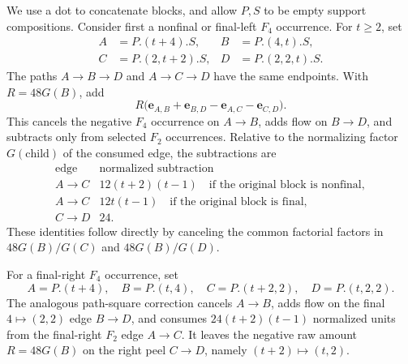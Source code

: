 \documentclass[11pt]{amsart}
\theoremstyle{definition}
\theoremstyle{remark}
\newcommand{\edge}[2]{\mathbf e_{#1,#2}}
\begin{document}
We use a dot to concatenate blocks, and allow $P,S$ to be empty support
compositions.  Consider first a nonfinal or final-left $F_4$ occurrence.
For $t\ge2$, set
\begin{equation}
 \begin{aligned}
 A&=P.(t+4).S,&B&=P.(4,t).S,\\
 C&=P.(2,t+2).S,&D&=P.(2,2,t).S.
 \end{aligned}
 \label{eq:left-square-vertices}
\end{equation}
The paths $A\to B\to D$ and $A\to C\to D$ have the same endpoints.
With $R=48G(B)$, add
\begin{equation}
 R\bigl(\edge AB+\edge BD-\edge AC-\edge CD\bigr).
 \label{eq:left-square}
\end{equation}
This cancels the negative $F_4$ occurrence on $A\to B$, adds flow on
$B\to D$, and subtracts only from selected $F_2$ occurrences.  Relative
to the normalizing factor $G(\text{child})$ of the consumed edge, the
subtractions are
\begin{equation}
 \begin{array}{c|c}
 \text{edge}&\text{normalized subtraction}\\ \hline
 A\to C&12(t+2)(t-1)\quad\text{if the original block is nonfinal},\\
 A\to C&12t(t-1)\quad\text{if the original block is final},\\
 C\to D&24.
 \end{array}
 \label{eq:left-square-costs}
\end{equation}
These identities follow directly by canceling the common factorial factors
in $48G(B)/G(C)$ and $48G(B)/G(D)$.

For a final-right $F_4$ occurrence, set
\begin{equation}
 A=P.(t+4),\quad B=P.(t,4),\quad
 C=P.(t+2,2),\quad D=P.(t,2,2).
 \label{eq:right-square-vertices}
\end{equation}
The analogous path-square correction cancels $A\to B$, adds flow on the
final $4\mapsto(2,2)$ edge $B\to D$, and consumes
$24(t+2)(t-1)$ normalized units from the final-right $F_2$ edge
$A\to C$.  It leaves the negative raw amount $R=48G(B)$ on the right
peel $C\to D$, namely $(t+2)\mapsto(t,2)$.
\end{document}
